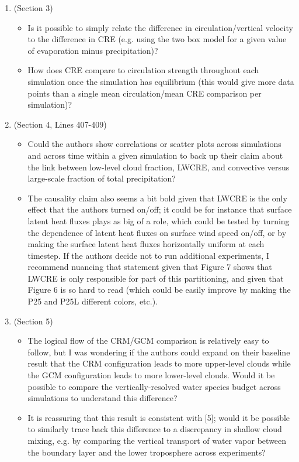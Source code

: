 \documentclass[draft]{agujournal2019}
\begin{document}
\begin{enumerate}
  \item (Section 3)
    \begin{itemize}
      \item Is it possible to simply relate the difference in circulation/vertical velocity to the difference in CRE (e.g. using the
two box model for a given value of evaporation minus precipitation)?
      \item How does CRE compare to circulation strength throughout each simulation once the simulation has equilibrium
(this would give more data points than a single mean circulation/mean CRE comparison per simulation)?
    \end{itemize}
  \item (Section 4, Lines 407-409)
    \begin{itemize}
      \item Could the authors show correlations or scatter plots across simulations and across time within a given simulation
to back up their claim about the link between low-level cloud fraction, LWCRE, and convective versus large-scale
fraction of total precipitation?
      \item The causality claim also seems a bit bold given that LWCRE is the only effect that the authors turned on/off; it could
be for instance that surface latent heat fluxes plays as big of a role, which could be tested by turning the dependence
of latent heat fluxes on surface wind speed on/off, or by making the surface latent heat fluxes horizontally uniform
at each timestep. If the authors decide not to run additional experiments, I recommend nuancing that statement
given that Figure 7 shows that LWCRE is only responsible for part of this partitioning, and given that Figure 6 is
so hard to read (which could be easily improve by making the P25 and P25L different colors, etc.).
    \end{itemize}
  \item (Section 5)
    \begin{itemize}
      \item The logical flow of the CRM/GCM comparison is relatively easy to follow, but I was wondering if the authors
could expand on their baseline result that the CRM configuration leads to more upper-level clouds while the GCM
configuration leads to more lower-level clouds. Would it be possible to compare the vertically-resolved water species
budget across simulations to understand this difference?
      \item It is reassuring that this result is consistent with [5]; would it be possible to similarly trace back this difference to a
discrepancy in shallow cloud mixing, e.g. by comparing the vertical transport of water vapor between the boundary
layer and the lower troposphere across experiments?
    \end{itemize}
\end{enumerate}
\end{document}

